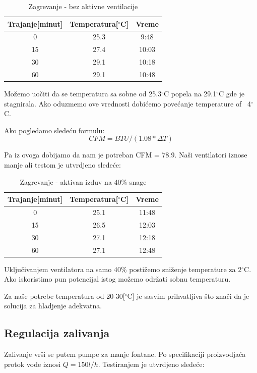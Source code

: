 \documentclass[a4paper,11pt]{book}
\begin{document}
\begin{table}[ht]
  \caption{Zagrevanje - bez aktivne ventilacije}
  \centering
  \begin{tabular}{|c|c|c|}
  \hline
    Trajanje[minut] & Temperatura[$^\circ$C] & Vreme\\ \hline
  0 & 25.3 & 9:48 \\ \hline
  15 & 27.4 & 10:03 \\ \hline
  30 & 29.1 & 10:18 \\ \hline
  60 & 29.1 & 10:48 \\ \hline
  \end{tabular}
\end{table}

Možemo uočiti da se temperatura sa sobne od 25.3$^\circ$C popela na 29.1$^\circ$C gde je stagnirala. Ako oduzmemo ove vrednosti dobićemo povećanje temperature of ~4$^\circ$C.

Ako pogledamo sledeću formulu: 
\[ CFM = BTU / (1.08 * \Delta T)\]

Pa iz ovoga dobijamo da nam je potreban CFM = 78.9. Naši ventilatori iznose manje ali testom je utvrdjeno sledeće:

\begin{table}[ht]
  \caption{Zagrevanje - aktivan izduv na 40\% snage}
  \centering
  \begin{tabular}{|c|c|c|}
  \hline
    Trajanje[minut] & Temperatura[$^\circ$C] & Vreme\\ \hline
  0 & 25.1 & 11:48 \\ \hline
  15 & 26.5 & 12:03 \\ \hline
  30 & 27.1 & 12:18 \\ \hline
  60 & 27.1 & 12:48 \\ \hline
  \end{tabular}
\end{table}

Uključivanjem ventilatora na samo 40\% postižemo sniženje temperature za 2$^\circ$C. Ako iskoristimo pun potencijal istog možemo održati sobnu temperaturu.

Za naše potrebe temperatura od 20-30[$^\circ$C] je sasvim prihvatljiva što znači da je solucija za hladjenje adekvatna.

\subsection{Regulacija zalivanja}

Zalivanje vrši se putem pumpe za manje fontane. Po specifikaciji proizvodjača protok vode iznosi $Q = 150 l/h$. Testiranjem je utvrdjeno sledeće:
\end{document}
